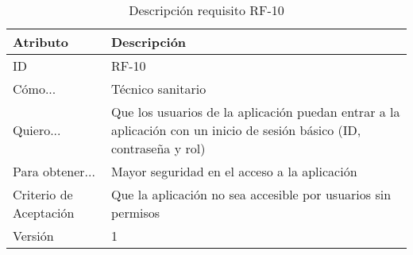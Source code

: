\begin{table}[H]
    \label{tab:reqF10}
 	\caption{Descripción requisito RF-10}
	\centering

	\begin{tabular}{C{3cm}|C{12cm}}
 		\toprule
 		\textbf{Atributo} & \textbf{Descripción} \\
 		\midrule
 	    ID & RF-10 \\
 	    Cómo... & Técnico sanitario \\
 	    Quiero... & Que los usuarios de la aplicación puedan entrar a la aplicación con un inicio de sesión básico (ID, contraseña y rol) \\
 	    Para obtener... & Mayor seguridad en el acceso a la aplicación  \\
 	    Criterio de Aceptación & Que la aplicación no sea accesible por usuarios sin permisos \\
 	    Versión & 1 \\
 		\bottomrule
 		\end{tabular}
\end{table}

